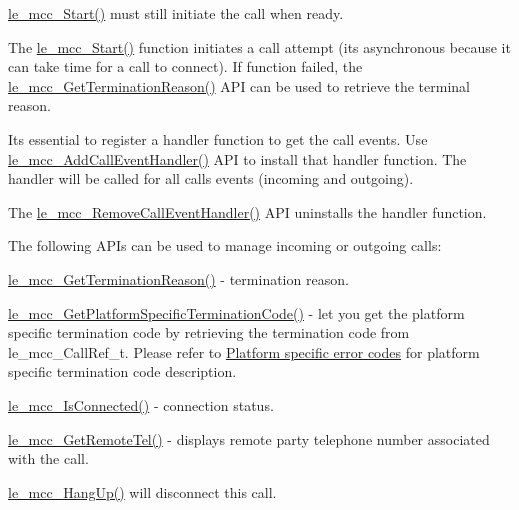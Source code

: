 \hyperlink{le__mcc__interface_8h_a72a32869bb23864b3e86c606368bed70}{le\+\_\+mcc\+\_\+\+Start()} must still initiate the call when ready.

The \hyperlink{le__mcc__interface_8h_a72a32869bb23864b3e86c606368bed70}{le\+\_\+mcc\+\_\+\+Start()} function initiates a call attempt (it\textquotesingle{}s asynchronous because it can take time for a call to connect). If function failed, the \hyperlink{le__mcc__interface_8h_ab16921abc02e0569b129f4a7d92bf3c9}{le\+\_\+mcc\+\_\+\+Get\+Termination\+Reason()} A\+PI can be used to retrieve the terminal reason.

It\textquotesingle{}s essential to register a handler function to get the call events. Use \hyperlink{le__mcc__interface_8h_ab826cf4b9e3911e659a90d483081e7fe}{le\+\_\+mcc\+\_\+\+Add\+Call\+Event\+Handler()} A\+PI to install that handler function. The handler will be called for all calls\textquotesingle{} events (incoming and outgoing).

The \hyperlink{le__mcc__interface_8h_aa7682ff49924db10aefee547fcb0b4d8}{le\+\_\+mcc\+\_\+\+Remove\+Call\+Event\+Handler()} A\+PI uninstalls the handler function.

The following A\+P\+Is can be used to manage incoming or outgoing calls\+:
\begin{DoxyItemize}
\item \hyperlink{le__mcc__interface_8h_ab16921abc02e0569b129f4a7d92bf3c9}{le\+\_\+mcc\+\_\+\+Get\+Termination\+Reason()} -\/ termination reason.
\item \hyperlink{le__mcc__interface_8h_a68b9b8ed1b221924dcea1be0fd610a54}{le\+\_\+mcc\+\_\+\+Get\+Platform\+Specific\+Termination\+Code()} -\/ let you get the platform specific termination code by retrieving the termination code from {\ttfamily le\+\_\+mcc\+\_\+\+Call\+Ref\+\_\+t}. Please refer to \hyperlink{platformConstraintsSpecificErrorCodes}{Platform specific error codes} for platform specific termination code description.
\item \hyperlink{le__mcc__interface_8h_a07e4856dffdbf887f51879e39ec43e42}{le\+\_\+mcc\+\_\+\+Is\+Connected()} -\/ connection status.
\item \hyperlink{le__mcc__interface_8h_a6b5922dc325e4f45c90b2ecfd0f0a74f}{le\+\_\+mcc\+\_\+\+Get\+Remote\+Tel()} -\/ displays remote party telephone number associated with the call.
\item \hyperlink{le__mcc__interface_8h_a7b9567715a3cd30c83a3b6886eeb2044}{le\+\_\+mcc\+\_\+\+Hang\+Up()} will disconnect this call.
\end{DoxyItemize}

